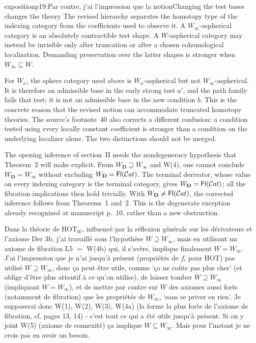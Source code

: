 \begin{dcomment}{exposition}{p19:Par contre, j'ai l'impression que la notion}{Changing the test bases changes the theory}
The revised hierarchy separates the homotopy type of the indexing category from the coefficients used to observe it. A \(W_\infty\)-aspherical category is an absolutely contractible test shape. A \(W\)-aspherical category may instead be invisible only after truncation or after a chosen cohomological localization. Demanding preservation over the latter shapes is stronger when \(W_\infty\subseteq W\).

For \(W_n\), the sphere category used above is \(W_n\)-aspherical but not \(W_\infty\)-aspherical. It is therefore an admissible base in the early strong test \(a'\), and the path family fails that test; it is not an admissible base in the new condition \(b\). This is the concrete reason that the revised notion can accommodate truncated homotopy theories. The source's footnote~40 also corrects a different confusion: a condition tested using every locally constant coefficient is stronger than a condition on the underlying localizer alone. The two distinctions should not be merged.

The opening inference of section~II needs the nondegeneracy hypothesis that Theorem~2 will make explicit. From \(W_{\mathbf D}\supseteq W_\infty\) and W(4), one cannot conclude \(W_{\mathbf D}=W_\infty\) without excluding \(W_{\mathbf D}=\mathsf{Fl}(\mathcal{C}at)\). The terminal derivator, whose value on every indexing category is the terminal category, gives \(W_{\mathbf D}=\mathsf{Fl}(\mathcal{C}at)\); all the fibration implications then hold trivially. With \(W_{\mathbf D}\ne\mathsf{Fl}(\mathcal{C}at)\), the corrected inference follows from Theorems~1 and~2. This is the degenerate exception already recognized at manuscript p.~10, rather than a new obstruction.
\end{dcomment}


Dans la théorie de $\mathrm{HOT}_W$, influencé par la réflexion générale sur les dérivateurs et l'axiome Der 3b, j'ai travaillé sous l'hypothèse $W \supseteq W_\infty$, mais en utilisant un axiome de fibration L5 $=$ W(4b) qui, il s'avère, implique finalement $W = W_\infty$. J'ai l'impression que je n'ai jusqu'à présent (propriétés de $f_!$ pour HOT) pas utilisé $W \supseteq W_\infty$, donc ça peut être utile, comme `ça ne coûte pas plus cher' (et oblige d'être plus attentif à ce qu'on utilise), de laisser tomber $W \supseteq W_\infty$ (impliquant $W = W_\infty$), et de mettre par contre sur $W$ des axiomes aussi forts (notamment de fibration) que les propriétés de $W_\infty$, `sans se priver en rien'. Je supposerai donc W(1), W(2), W(3), W(4a) (la forme la plus forte de l'axiome de fibration, cf. pages 13, 14) - c'est tout ce qui a été utile jusqu'à présent. Si on y joint W(5) (axiome de connexité) ça implique $W \subseteq W_\infty$. Mais pour l'instant je ne crois pas en avoir un besoin.


